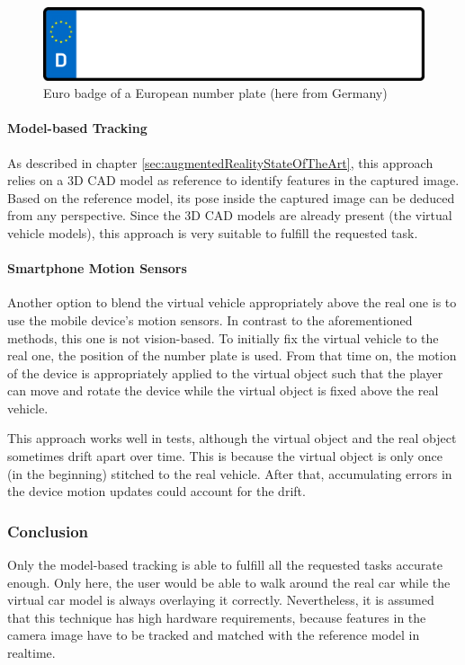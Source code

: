 \begin{figure}[btph]
  \centering
        \includegraphics[width=.25\linewidth]{gfx/marker_full}
        \caption{Euro badge of a European number plate (here from Germany)}
        \label{fig:euroBadge}
\end{figure}

\paragraph{Model-based Tracking}
As described in chapter \ref{sec:augmentedRealityStateOfTheArt}, this approach relies on a 3D CAD model as reference to identify features in the captured image. Based on the reference model, its pose inside the captured image can be deduced from any perspective. Since the 3D CAD models are already present (the virtual vehicle models), this approach is very suitable to fulfill the requested task.

\paragraph{Smartphone Motion Sensors}
Another option to blend the virtual vehicle appropriately above the real one is to use the mobile device's motion sensors. In contrast to the aforementioned methods, this one is not vision-based. To initially fix the virtual vehicle to the real one, the position of the number plate is used. From that time on, the motion of the device is appropriately applied to the virtual object such that the player can move and rotate the device while the virtual object is fixed above the real vehicle.

This approach works well in tests, although the virtual object and the real object sometimes drift apart over time. This is because the virtual object is only once (in the beginning) stitched to the real vehicle. After that, accumulating errors in the device motion updates could account for the drift.

\subsubsection{Conclusion}
Only the model-based tracking is able to fulfill all the requested tasks accurate enough. Only here, the user would be able to walk around the real car while the virtual car model is always overlaying it correctly. Nevertheless, it is assumed that this technique has high hardware requirements, because features in the camera image have to be tracked and matched with the reference model in realtime.

